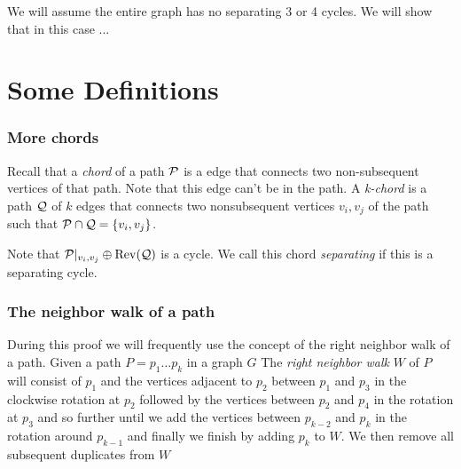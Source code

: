 \renewcommand{\Q}{\scr Q}


We will assume the entire graph has no separating 3 or 4 cycles. We will show that in this case ...

\section{Some Definitions}
  \subsubsection{More chords}
    Recall that a \emph{chord} of a path $\P$ is a edge that connects two non-subsequent vertices of that path. Note that this edge can't be in the path. A \emph{k-chord} is a path $\Q$ of $k$ edges that connects two nonsubsequent vertices $v_i, v_j$ of the path such that $\P \cap \Q = \braces{v_i, v_j}$.

    Note that $\P|_{v_i, v_j} \oplus \rev(\Q)$ is a cycle. We call this chord \emph{separating} if this is a separating cycle. 


  \subsubsection{The neighbor walk of a path}
    During this proof we will frequently use the concept of the right neighbor walk of a path.
    Given a path $P = p_1 \ldots p_k$ in a graph $G$
    The \emph{right neighbor walk} $W$ of $P$ will consist of $p_1$ and the vertices adjacent to $p_{2}$ between $p_1$ and $p_{3}$ in the clockwise rotation at $p_{2}$ followed by the vertices between $p_{2}$ and $p_{4}$ in the rotation at $p_{3}$ and so further until we add the vertices between $p_{k-2}$ and $p_k$ in the rotation around $p_{k-1}$ and finally we finish by adding $p_k$ to $W$.
    We then remove all subsequent duplicates from $W$

